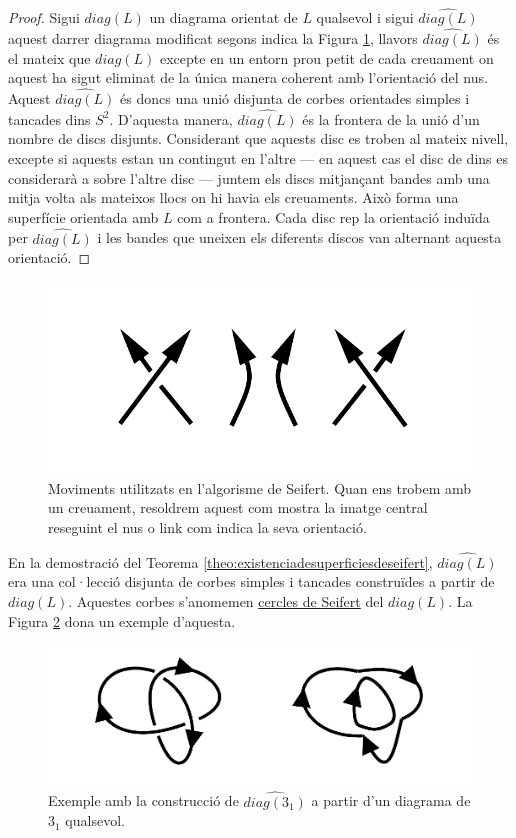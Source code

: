 \begin{proof}
	Sigui $diag(L)$ un diagrama orientat de $L$ qualsevol i sigui $\widehat{diag(L)}$ aquest darrer diagrama modificat segons indica la Figura \ref{fig:movimentsdeseifert}, llavors $\widehat{diag(L)}$ és el mateix que $diag(L)$ excepte en un entorn prou petit de cada creuament on aquest ha sigut eliminat de la única manera coherent amb l'orientació del nus. Aquest $\widehat{diag(L)}$ és doncs una unió disjunta de corbes orientades simples i tancades dins $S^2$. D'aquesta manera, $\widehat{diag(L)}$ és la frontera de la unió d'un nombre de discs disjunts. Considerant que aquests disc es troben al mateix nivell, excepte si aquests estan un contingut en l'altre --- en aquest cas el disc de dins es considerarà a sobre l'altre disc --- juntem els discs mitjançant bandes amb una mitja volta als mateixos llocs on hi havia els creuaments. Això forma una superfície orientada amb $L$ com a frontera. Cada disc rep la orientació induïda per $\widehat{diag(L)}$ i les bandes que uneixen els diferents discos van alternant aquesta orientació.
\end{proof}

\begin{figure}
	\centering
	\includegraphics[width=0.6\linewidth]{img/seifert.png}
	\caption{Moviments utilitzats en l'algorisme de Seifert. Quan ens trobem amb un creuament, resoldrem aquest com mostra la imatge central reseguint el nus o link com indica la seva orientació.}\label{fig:movimentsdeseifert}
\end{figure}

En la demostració del Teorema \ref{theo:existenciadesuperficiesdeseifert}, $\widehat{diag(L)}$ era una col·lecció disjunta de corbes simples i tancades construïdes a partir de $diag(L)$. Aquestes corbes s'anomemen \underline{cercles de Seifert} del $diag(L)$. La Figura \ref{fig:cerclesdeseifert} dona un exemple d'aquesta.\\

\begin{figure}
	\centering
	\includegraphics[width=\linewidth]{img/cerclesdeseifert.png}
	\caption{Exemple amb la construcció de $\widehat{diag(3_1)}$ a partir d'un diagrama de $3_1$ qualsevol.}\label{fig:cerclesdeseifert}
\end{figure}

